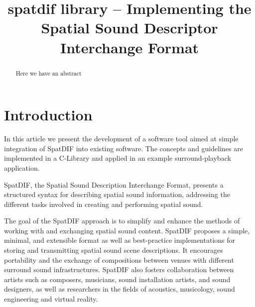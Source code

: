 \documentclass[a4paper]{article}
\title{spatdif library -- Implementing the Spatial Sound Descriptor Interchange Format}
\begin{document}
%

\newcommand{\red}[1]{\textcolor{red}{#1}}
\newcommand{\todo}[1]{\noindent\textcolor{red}{[\underline{TODO}: #1]}}

\makeatletter 
\def\ps@myheadings{%
\let\ps@jpl@in\ps@plain%
\def\@evenhead{\reset@font\hfil\leftmark\hfil}%
\def\@oddhead{\reset@font\hfil\rightmark\hfil}%
\let\@mkboth\@gobbletwo%
\let\sectionmark\@gobble%
\let\subsectionmark\@gobble%
% 
\def\@oddfoot{\reset@font\hfil-- \thepage --\hfil}%
\let\@evenfoot\@oddfoot 
} 
\makeatother 
\setcounter{page}{1} 
\pagestyle{myheadings} 
\maketitle
\thispagestyle{myheadings}
\sloppy
{}


\begin{abstract}

Here we have an abstract

\end{abstract}


\section{Introduction}

In this article we present the development of a software tool aimed at simple integration of SpatDIF into existing software.
The concepts and guidelines are implemented in a C-Library and applied in an example surround-playback application.

SpatDIF, the Spatial Sound Description Interchange Format, presents a structured syntax for describing spatial sound information, addressing the different tasks involved in creating and performing spatial sound.

The goal of the SpatDIF approach is to simplify and enhance the methods of working with and exchanging spatial sound content. 
SpatDIF proposes a simple, minimal, and extensible format as well as best-practice implementations for storing and transmitting spatial sound scene descriptions. 
It encourages portability and the exchange of compositions between venues with different surround sound infrastructures. 
SpatDIF also fosters collaboration between artists such as composers, musicians, sound installation artists, and sound designers, as well as researchers in the fields of acoustics, musicology, sound engineering and virtual reality.
\end{document}
